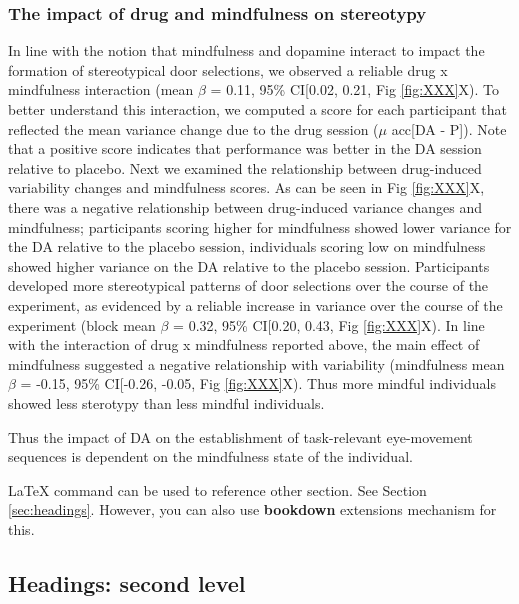 \documentclass{article}
\begin{document}
\hypertarget{the-impact-of-drug-and-mindfulness-on-stereotypy}{%
\subsubsection{The impact of drug and mindfulness on
stereotypy}\label{the-impact-of-drug-and-mindfulness-on-stereotypy}}

In line with the notion that mindfulness and dopamine interact to impact
the formation of stereotypical door selections, we observed a reliable
drug x mindfulness interaction (mean \(\beta\) = 0.11, 95\% CI{[}0.02,
0.21, Fig \ref{fig:XXX}X). To better understand this interaction, we
computed a score for each participant that reflected the mean variance
change due to the drug session (\(\mu\) acc{[}DA - P{]}). Note that a
positive score indicates that performance was better in the DA session
relative to placebo. Next we examined the relationship between
drug-induced variability changes and mindfulness scores. As can be seen
in Fig \ref{fig:XXX}X, there was a negative relationship between
drug-induced variance changes and mindfulness; participants scoring
higher for mindfulness showed lower variance for the DA relative to the
placebo session, individuals scoring low on mindfulness showed higher
variance on the DA relative to the placebo session. Participants
developed more stereotypical patterns of door selections over the course
of the experiment, as evidenced by a reliable increase in variance over
the course of the experiment (block mean \(\beta\) = 0.32, 95\%
CI{[}0.20, 0.43, Fig \ref{fig:XXX}X). In line with the interaction of
drug x mindfulness reported above, the main effect of mindfulness
suggested a negative relationship with variability (mindfulness mean
\(\beta\) = -0.15, 95\% CI{[}-0.26, -0.05, Fig \ref{fig:XXX}X). Thus
more mindful individuals showed less sterotypy than less mindful
individuals.

Thus the impact of DA on the establishment of task-relevant eye-movement
sequences is dependent on the mindfulness state of the individual.

LaTeX command can be used to reference other section. See Section
\ref{sec:headings}. However, you can also use \textbf{bookdown}
extensions mechanism for this.

\hypertarget{headings-second-level}{%
\subsection{Headings: second level}\label{headings-second-level}}
\end{document}
